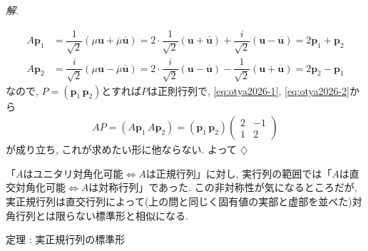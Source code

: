 \documentclass[titlepage]{jsarticle}
\numberwithin{equation}{section}
\newenvironment{kaitou}[1][解]{%
\begin{proofbox}%
\textit{#1. }\ignorespaces
}{%
\hfill$\diamondsuit$%
\end{proofbox}%
}
\begin{document}
\begin{kaitou}
\begin{align}
A\bm{p}_1 &= \dfrac{1}{\sqrt{2}}(\mu\bm{u} + \overline{\mu}\overline{\bm{u}}) = 2\cdot\dfrac{1}{\sqrt{2}}(\bm{u} + \overline{\bm{u}}) + \dfrac{i}{\sqrt{2}}(\bm{u}- \overline{\bm{u}}) = 2\bm{p}_1+\bm{p}_2 \label{eq:otya2026-1} \\
A\bm{p}_2 & = \dfrac{i}{\sqrt{2}}(\mu\bm{u} - \overline{\mu}\overline{\bm{u}}) = 2\cdot\dfrac{i}{\sqrt{2}}(\bm{u} - \overline{\bm{u}}) - \dfrac{1}{\sqrt{2}}(\bm{u}+ \overline{\bm{u}}) = 2\bm{p}_2 - \bm{p}_1 \label{eq:otya2026-2}
\end{align}
なので, $P = (\bm{p}_1\,\bm{p}_2)$とすれば$P$は正則行列で, \eqref{eq:otya2026-1}, \eqref{eq:otya2026-2}から
\begin{align*}
AP = (A\bm{p}_1\, A\bm{p}_2) = (\bm{p}_1\,\bm{p}_2)
\begin{pmatrix}
2 & -1\\
1 & 2
\end{pmatrix}
\end{align*}
が成り立ち, これが求めたい形に他ならない. よって
\end{kaitou}
「$A$はユニタリ対角化可能$\iff A$は正規行列」に対し, 実行列の範囲では「$A$は直交対角化可能$\iff A$は対称行列」であった. この非対称性が気になるところだが, 実正規行列は直交行列によって(上の問と同じく固有値の実部と虚部を並べた)対角行列とは限らない標準形と相似になる.
\begin{thm}{定理 : 実正規行列の標準形}{}
\end{thm}
\end{document}
